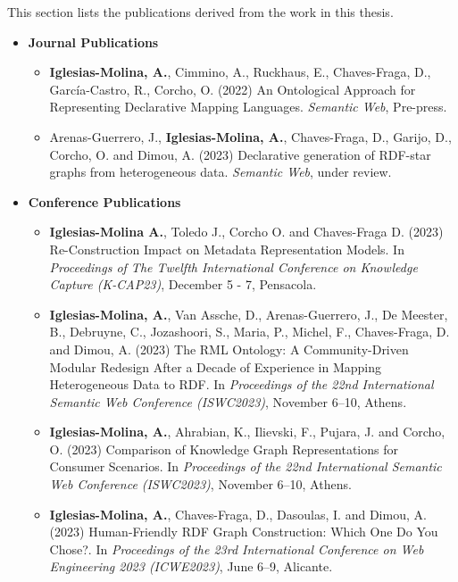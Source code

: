 This section lists the publications derived from the work in this thesis.


\begin{itemize}
    \item \textbf{Journal Publications}
    \begin{itemize}
        \item \textbf{Iglesias-Molina, A.}, Cimmino, A., Ruckhaus, E., Chaves-Fraga, D., García-Castro, R., Corcho, O. (2022) An Ontological Approach for Representing Declarative Mapping Languages. \textit{Semantic Web}, Pre-press. 
    
        \item Arenas-Guerrero, J., \textbf{Iglesias-Molina, A.}, Chaves-Fraga, D., Garijo, D., Corcho, O. and Dimou, A. (2023) Declarative generation of RDF-star graphs from heterogeneous data. \textit{Semantic Web}, under review.
    \end{itemize}
\end{itemize}




\begin{itemize}
    \item \textbf{Conference Publications}
    \begin{itemize}
        \item \textbf{Iglesias-Molina A.}, Toledo J., Corcho O. and Chaves-Fraga D. (2023) Re-Construction Impact on Metadata Representation Models. In \textit{Proceedings of The Twelfth International Conference on Knowledge Capture (K-CAP23)}, December 5 - 7, Pensacola.
    
        \item \textbf{Iglesias-Molina, A.}, Van Assche, D., Arenas-Guerrero, J., De Meester, B., Debruyne, C., Jozashoori, S., Maria, P., Michel, F., Chaves-Fraga, D. and Dimou, A. (2023) The RML Ontology: A Community-Driven Modular Redesign After a Decade of Experience in Mapping Heterogeneous Data to RDF. In \textit{Proceedings of the 22nd International Semantic Web Conference (ISWC2023)}, November 6--10, Athens.
    
        \item \textbf{Iglesias-Molina, A.}, Ahrabian, K., Ilievski, F., Pujara, J. and Corcho, O. (2023) Comparison of Knowledge Graph Representations for Consumer Scenarios. In \textit{Proceedings of the 22nd International Semantic Web Conference (ISWC2023)}, November 6--10, Athens.
    
        \item \textbf{Iglesias-Molina, A.}, Chaves-Fraga, D., Dasoulas, I. and Dimou, A. (2023) Human-Friendly RDF Graph Construction: Which One Do You Chose?. In \textit{Proceedings of the 23rd International Conference on Web Engineering 2023 (ICWE2023)}, June 6--9, Alicante.
    \end{itemize}
\end{itemize}

